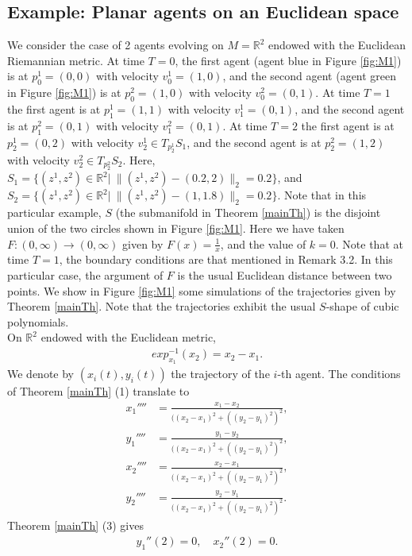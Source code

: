 \documentclass[letterpaper, 10 pt, conference]{ieeeconf}  %
\newcommand{\R}{\mathbb{R}}
\begin{document}
\subsection{Example: Planar agents on an Euclidean space}\label{example1}
We consider the case of 2 agents evolving on $M = \mathbb{R}^2$ endowed with the Euclidean Riemannian metric. At time $T =0$, the first agent (agent blue in Figure \ref{fig:M1}) is at $p_0^1 = (0,0)$ with velocity $v_0^1 = (1,0)$, and the second agent (agent green in Figure \ref{fig:M1}) is at $p_0^2 = (1,0)$ with velocity $v_0^2 = (0,1)$. At time $T =1$ the first agent is at $p_1^1 = (1,1)$ with velocity $v_1^1 = (0,1)$, and the second agent is at $p_1^2 = (0,1)$ with velocity $v_1^2 = (0,1)$.  At time $T =2$ the first agent is at $p_2^1 = (0,2)$ with velocity $v_2^1 \in T_{p_2^1}S_1$, and the second agent is at $p_2^2 = (1,2)$ with velocity $v_2^2 \in T_{p_2^2}S_2$. Here, $S_1 = \{(z^1,z^2) \in \R^2 | \ \|(z^1,z^2)-(0.2, 2) \|_2 = 0.2\}$, and $S_2 = \{(z^1,z^2) \in \mathbb{R}^2 | \ \|(z^1,z^2)-(1, 1.8) \|_2 = 0.2\}$.  Note that in this particular example, $S$ (the submanifold
in Theorem \ref{mainTh}) is the disjoint union of the two circles shown in Figure \ref{fig:M1}. Here we have taken $F : (0,\infty) \rightarrow (0,\infty)$ given by  $\displaystyle{F(x) = \frac{1}{x}}$, and the value of $k=0$. Note that at time $T=1$, the boundary conditions are that mentioned in Remark 3.2. In this particular case, the argument of $F$ is the usual Euclidean distance between two points. We show in Figure \ref{fig:M1} some simulations of the trajectories given by Theorem \ref{mainTh}. Note that the trajectories exhibit the usual $S$-shape of cubic polynomials. \\
On $\mathbb{R}^2$ endowed with the Euclidean metric,  
\begin{align*}
exp^{-1}_{x_1}(x_2) = x_2 - x_1.
\end{align*}
We denote by $(x_i(t), y_i(t))$ the trajectory of the $i$-th agent. The conditions of Theorem \ref{mainTh} (1) translate to
\begin{align*}
x_1'''' &= \frac{x_1 - x_2}{((x_2-x_1)^2 + ((y_2-y_1)^2)^2}, \\
y_1'''' &= \frac{y_1 - y_2}{((x_2-x_1)^2 + ((y_2-y_1)^2)^2}, \\ 
x_2'''' &= \frac{x_2 - x_1}{((x_2-x_1)^2 + ((y_2-y_1)^2)^2}, \\ 
y_2'''' &= \frac{y_2 - y_1}{((x_2-x_1)^2 + ((y_2-y_1)^2)^2}. 
\end{align*}
Theorem \ref{mainTh} (3) gives
\begin{align*}
y_1''(2) = 0, \quad x_2''(2) = 0.
\end{align*}
\end{document}
